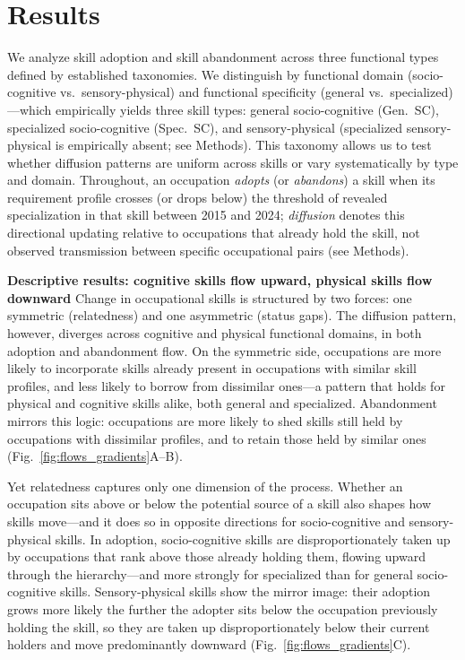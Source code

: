 \documentclass[11pt, letterpaper]{article} %
\newcommand{\parencite}[1]{\cite{#1}}
\begin{document}
\section*{Results}

We analyze skill adoption and skill abandonment across three functional types defined by established taxonomies. We distinguish by functional domain (socio-cognitive vs.\ sensory-physical) \parencite{alabdulkareem_unpacking_2018} and functional specificity (general vs.\ specialized) \parencite{hosseinioun_skill_2025}---which empirically yields three skill types: general socio-cognitive (Gen.\ SC), specialized socio-cognitive (Spec.\ SC), and sensory-physical (specialized sensory-physical is empirically absent; see Methods). This taxonomy allows us to test whether diffusion patterns are uniform across skills or vary systematically by type and domain. Throughout, an occupation \emph{adopts} (or \emph{abandons}) a skill when its requirement profile crosses (or drops below) the threshold of revealed specialization in that skill between 2015 and 2024; \emph{diffusion} denotes this directional updating relative to occupations that already hold the skill, not observed transmission between specific occupational pairs (see Methods).

\textbf{Descriptive results: cognitive skills flow upward, physical skills flow downward} Change in occupational skills is structured by two forces: one symmetric (relatedness) and one asymmetric (status gaps). The diffusion pattern, however, diverges across cognitive and physical functional domains, in both adoption and abandonment flow. On the symmetric side, occupations are more likely to incorporate skills already present in occupations with similar skill profiles, and less likely to borrow from dissimilar ones---a pattern that holds for physical and cognitive skills alike, both general and specialized. Abandonment mirrors this logic: occupations are more likely to shed skills still held by occupations with dissimilar profiles, and to retain those held by similar ones (Fig.~\ref{fig:flows_gradients}A--B).

Yet relatedness captures only one dimension of the process. Whether an occupation sits above or below the potential source of a skill also shapes how skills move—and it does so in opposite directions for socio-cognitive and sensory-physical skills. In adoption, socio-cognitive skills are disproportionately taken up by occupations that rank above those already holding them, flowing upward through the hierarchy---and more strongly for specialized than for general socio-cognitive skills. Sensory-physical skills show the mirror image: their adoption grows more likely the further the adopter sits below the occupation previously holding the skill, so they are taken up disproportionately below their current holders and move predominantly downward (Fig.~\ref{fig:flows_gradients}C).
\end{document}
